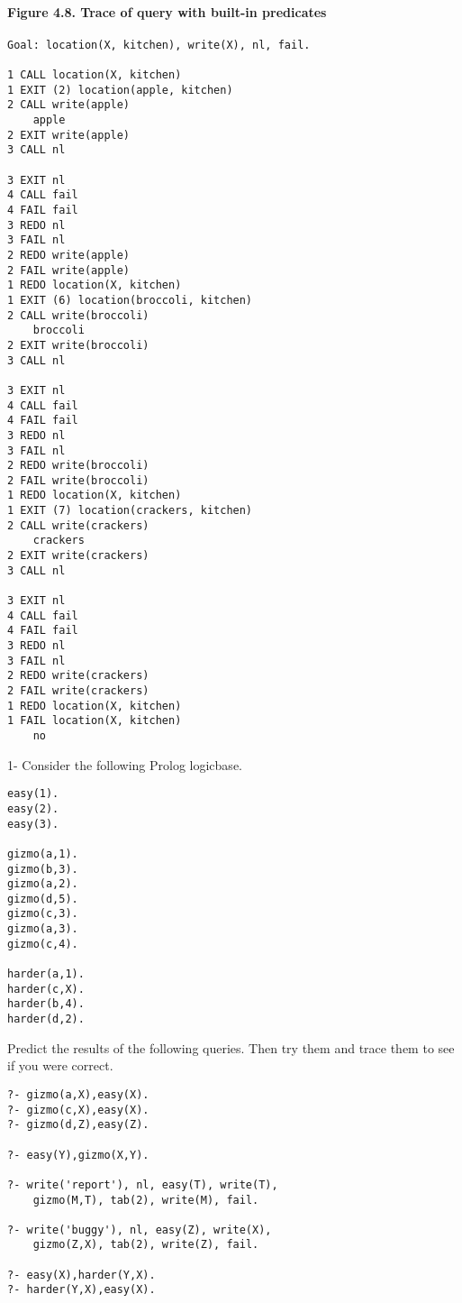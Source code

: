 
\paragraph{Figure 4.8. Trace of query with built-in predicates}
\begin{verbatim}
Goal: location(X, kitchen), write(X), nl, fail.

1 CALL location(X, kitchen)
1 EXIT (2) location(apple, kitchen)
2 CALL write(apple)
    apple
2 EXIT write(apple)
3 CALL nl

3 EXIT nl
4 CALL fail
4 FAIL fail
3 REDO nl
3 FAIL nl
2 REDO write(apple)
2 FAIL write(apple)
1 REDO location(X, kitchen)
1 EXIT (6) location(broccoli, kitchen)
2 CALL write(broccoli)
    broccoli
2 EXIT write(broccoli)
3 CALL nl

3 EXIT nl
4 CALL fail
4 FAIL fail
3 REDO nl
3 FAIL nl
2 REDO write(broccoli)
2 FAIL write(broccoli)
1 REDO location(X, kitchen)
1 EXIT (7) location(crackers, kitchen)
2 CALL write(crackers)
    crackers
2 EXIT write(crackers)
3 CALL nl

3 EXIT nl
4 CALL fail
4 FAIL fail
3 REDO nl
3 FAIL nl
2 REDO write(crackers)
2 FAIL write(crackers)
1 REDO location(X, kitchen)
1 FAIL location(X, kitchen)
    no
\end{verbatim}

\secdown


1- Consider the following Prolog logicbase.
\begin{verbatim}
easy(1).
easy(2).
easy(3).

gizmo(a,1).
gizmo(b,3).
gizmo(a,2).
gizmo(d,5).
gizmo(c,3).
gizmo(a,3).
gizmo(c,4).

harder(a,1).
harder(c,X).
harder(b,4).
harder(d,2).
\end{verbatim}

Predict the results of the following queries. Then try them and trace them to
see if you were correct.
\begin{verbatim}
?- gizmo(a,X),easy(X).
?- gizmo(c,X),easy(X).
?- gizmo(d,Z),easy(Z).

?- easy(Y),gizmo(X,Y).

?- write('report'), nl, easy(T), write(T), 
    gizmo(M,T), tab(2), write(M), fail.

?- write('buggy'), nl, easy(Z), write(X), 
    gizmo(Z,X), tab(2), write(Z), fail.

?- easy(X),harder(Y,X).
?- harder(Y,X),easy(X).
\end{verbatim}


